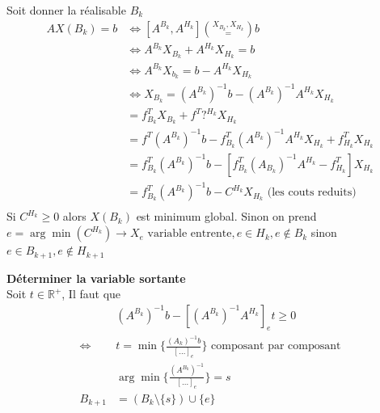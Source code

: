 \documentclass{article}
\theoremstyle{plain}%
\theoremstyle{definition}
\theoremstyle{remark}
\begin{document}
Soit donner la réalisable $ B_k $ 
\begin{align*}
    AX(B_k) = b &\Leftrightarrow [A^{B_k}, A^{H_k}] \binom{X_{B_k}, X_{H_k}} = b \\
                &\Leftrightarrow A^{B_k}X_{B_k} + A^{H_k}X_{H_k} = b \\
                &\Leftrightarrow A^{B_k}X_{b_k} = b - A^{H_k}X_{H_k} \\
                &\Leftrightarrow X_{B_k} = (A^{B_k})^{-1} b - (A^{B_k})^{-1} A^{H_k}X_{H_k} \\
                &= f^T_{B_k}X_{B_k} + f^T ?^{H_k}X_{H_k}  \\
                &= f^T (A^{B_k})^{-1}b - f_{B_k}^T (A^{B_k})^{-1} A^{H_k} X_{H_k} + f^T _{H_k}X_{H_k} \\
                &= f^T_{B_k}(A^{B_k})^{-1}b - [f^T_{B_k}(A_{B_k})^{-1} A^{H_k} - f^T_{H_k}] X_{H_k} \\
                &= f^T_{B_k}(A^{B_k})^{-1}b - C^{H_k} X_{H_k} \text{ (les couts reduits) } \\
\end{align*}
Si $ C^{H_k} \geq 0$ alors $ X(B_k) $ est minimum global. Sinon on prend $ e = \arg \min (C^{H_k}) \rightarrow X_e \text{ variable entrente}, e \in H_k, e \not \in B_k$ sinon $ e \in B_{k+1}, e \not \in H_{k+1} $ 

\textbf{Déterminer la variable sortante} \\
Soit $ t \in \mathbb{R}^+ $, Il faut que 
\begin{align*}
    &(A^{B_k})^{-1}b - [(A^{B_k})^{-1} A^{H_k}]_e t \geq 0 \\
    \Leftrightarrow& t  = \min \{\frac{(A_k)^{-1}b}{[\dots]_e}\} \text{ composant par composant} \\
    & \arg \min \{\frac{(A^{B_k})^{-1}}{[\dots]_e}\} = s \\
    B_{k+1} &= (B_k \setminus \{s\}) \cup \{e\}
\end{align*}
\end{document}
